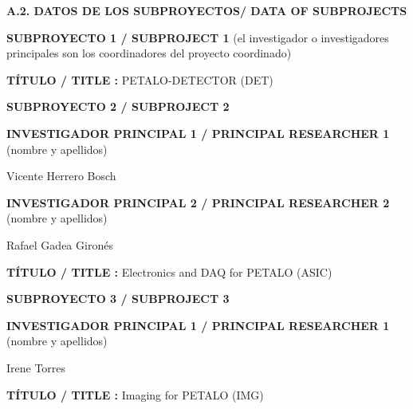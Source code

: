 \documentclass[a4paper,11pt,oneside]{article}
\begin{document}
 \vspace{12pt}


\noindent\textbf{A.2. DATOS DE LOS SUBPROYECTOS/ DATA OF SUBPROJECTS }
 \vspace{12pt}
 
\noindent\textbf{SUBPROYECTO 1 / SUBPROJECT 1} (el investigador o investigadores principales son los coordinadores del proyecto coordinado)

\vspace{6pt}
\noindent\textbf{TÍTULO / TITLE :} PETALO-DETECTOR (DET)
%

 \vspace{12pt}
 
\noindent\textbf{SUBPROYECTO 2 / SUBPROJECT 2}
\vspace{6pt}

\noindent\textbf{INVESTIGADOR PRINCIPAL 1 / PRINCIPAL RESEARCHER 1 } (nombre y apellidos)

\vspace{6pt}
\noindent Vicente Herrero Bosch

\vspace{12pt}
\noindent\textbf{INVESTIGADOR PRINCIPAL 2 / PRINCIPAL RESEARCHER 2} (nombre y apellidos)

\vspace{6pt}
Rafael Gadea Gironés


\vspace{6pt}
\noindent\textbf{TÍTULO / TITLE :} Electronics and DAQ for PETALO (ASIC)

\vspace{12pt}
\noindent\textbf{SUBPROYECTO 3 / SUBPROJECT 3}
\vspace{6pt}

\noindent\textbf{INVESTIGADOR PRINCIPAL 1 / PRINCIPAL RESEARCHER 1 } (nombre y apellidos)

\vspace{6pt}
\noindent Irene Torres

\vspace{6pt}
\noindent\textbf{TÍTULO / TITLE :} Imaging for PETALO (IMG)
\end{document}
